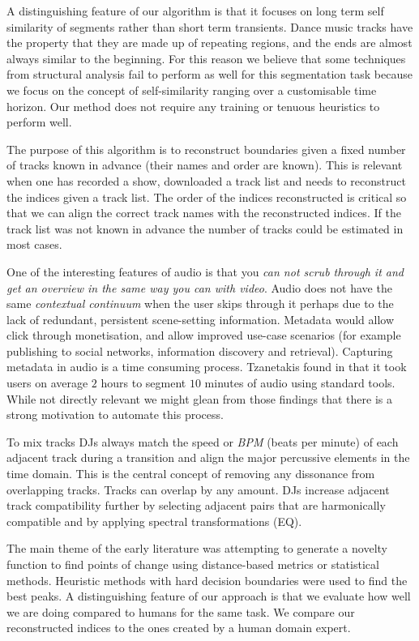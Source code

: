 \documentclass[twocolumn]{article}
\begin{document}
A distinguishing feature of our algorithm is that it focuses on long term self similarity of segments rather than short term transients. Dance music tracks have the property that they are made up of repeating regions, and the ends are almost always similar to the beginning. For this reason we believe that some techniques from structural analysis fail to perform as well for this segmentation task because we focus on the concept of self-similarity ranging over a customisable time horizon. Our method does not require any training or tenuous heuristics to perform well. 

The purpose of this algorithm is to reconstruct boundaries given a fixed number of tracks known in advance (their names and order are known). This is relevant when one has recorded a show, downloaded a track list and needs to reconstruct the indices given a track list. The order of the indices reconstructed is critical so that we can align the correct track names with the reconstructed indices. If the track list was not known in advance the number of tracks could be estimated in most cases.

One of the interesting features of audio is that you \textit{can not scrub through it and get an overview in the same way you can with video}. Audio does not have the same \textit{contextual continuum} when the user skips through it perhaps due to the lack of redundant, persistent scene-setting information. Metadata would allow click through monetisation, and allow improved use-case scenarios (for example publishing to social networks, information discovery and retrieval). Capturing metadata in audio is a time consuming process. Tzanetakis found in \cite{tzanetakis1999framework} that it took users on average $2$ hours to segment $10$ minutes of audio using standard tools. While not directly relevant we might glean from those findings that there is a strong motivation to automate this process. 

To mix tracks DJs always match the speed or \textit{BPM} (beats per minute) of each adjacent track during a transition and align the major percussive elements in the time domain. This is the central concept of removing any dissonance from overlapping tracks. Tracks can overlap by any amount. DJs increase adjacent track compatibility further by selecting adjacent pairs that are harmonically compatible and by applying spectral transformations (EQ).
 
The main theme of the early literature was attempting to generate a novelty function to find points of change using distance-based metrics or statistical methods. Heuristic methods with hard decision boundaries were used to find the best peaks. A distinguishing feature of our approach is that we evaluate how well we are doing compared to humans for the same task. We compare our reconstructed indices to the ones created by a human domain expert. 
\end{document}
